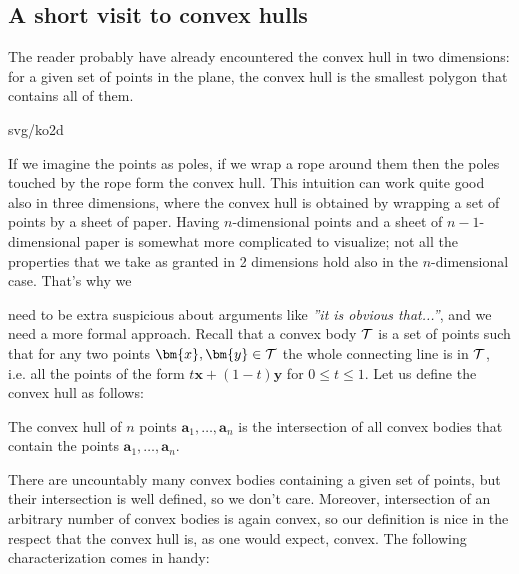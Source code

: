 \vspace*{-4ex}
\noindent
{}
\begin{shaded}
\subsection*{A short visit to convex hulls}

\noindent
The reader probably have already encountered the convex hull in two dimensions: for a given set of
points in the plane, the convex hull is the smallest polygon that contains all of them. 
\noindent
\begin{minipage}[t]{3.5cm}
  \vspace{0pt}
  \begin{myfig}{\textwidth}{svg/ko2d}
  \end{myfig}
\end{minipage}\hspace*{1cm}\begin{minipage}[t]{\textwidth-4.5cm}
  \vspace{0pt}
\noindent
If we imagine the points as poles, if we wrap a rope around them then the poles touched by the rope form
the convex hull. This intuition can work quite good also in three dimensions, where the convex hull is
obtained by wrapping a set of points by a sheet of paper. Having $n$-dimensional points and a sheet of
$n-1$-dimensional paper is somewhat more complicated to visualize; not all the properties that we 
take as granted in 2 dimensions hold also in the $n$-dimensional case. That's why we 
\end{minipage}

\vspace*{-8mm}
\noindent
need to be extra
suspicious about arguments like {\em ''it is obvious that...''}, and we need a more formal approach.
Recall that a convex body $\cal T$ is a set of points such that for any two points 
$\bm{x},\bm{y}\in{\cal T}$ the whole connecting line is in $\cal T$, i.e. all the points of the form 
$t\bm{x}+(1-t)\bm{y}$ for $0\le t\le 1$. Let us define the convex hull as follows:

\begin{dfn}
The convex hull of $n$ points $\bm{a}_1,\ldots,\bm{a}_n$ 
is the intersection of all convex bodies that contain the points $\bm{a}_1,\ldots,\bm{a}_n$.
\end{dfn}

\noindent
There are uncountably many convex bodies containing a given set of points, but their intersection is
well defined, so we don't care. Moreover, intersection of an arbitrary number of convex bodies is again convex,
so our definition is nice in the respect that the convex hull is, as one would expect, convex. The following
characterization comes in handy:


\end{shaded}
